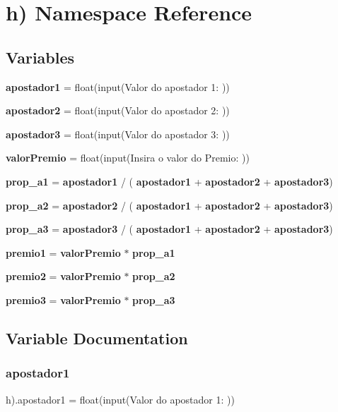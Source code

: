 \section{h) Namespace Reference}
\label{namespaceh_08}
\subsection*{Variables}
\begin{DoxyCompactItemize}
\item 
\textbf{ apostador1} = float(input(\textquotesingle{}Valor do apostador 1\+: \textquotesingle{}))
\item 
\textbf{ apostador2} = float(input(\textquotesingle{}Valor do apostador 2\+: \textquotesingle{}))
\item 
\textbf{ apostador3} = float(input(\textquotesingle{}Valor do apostador 3\+: \textquotesingle{}))
\item 
\textbf{ valor\+Premio} = float(input(\textquotesingle{}Insira o valor do Premio\+: \textquotesingle{}))
\item 
\textbf{ prop\+\_\+a1} = \textbf{ apostador1} / (\textbf{ apostador1} + \textbf{ apostador2} + \textbf{ apostador3})
\item 
\textbf{ prop\+\_\+a2} = \textbf{ apostador2} / (\textbf{ apostador1} + \textbf{ apostador2} + \textbf{ apostador3})
\item 
\textbf{ prop\+\_\+a3} = \textbf{ apostador3} / (\textbf{ apostador1} + \textbf{ apostador2} + \textbf{ apostador3})
\item 
\textbf{ premio1} = \textbf{ valor\+Premio} $\ast$ \textbf{ prop\+\_\+a1}
\item 
\textbf{ premio2} = \textbf{ valor\+Premio} $\ast$ \textbf{ prop\+\_\+a2}
\item 
\textbf{ premio3} = \textbf{ valor\+Premio} $\ast$ \textbf{ prop\+\_\+a3}
\end{DoxyCompactItemize}


\subsection{Variable Documentation}
\mbox{\label{namespaceh_08_a0faf51e2054f745b4819d31857e3b8c3}} 
\subsubsection{apostador1}
{\footnotesize\ttfamily h).apostador1 = float(input(\textquotesingle{}Valor do apostador 1\+: \textquotesingle{}))}



